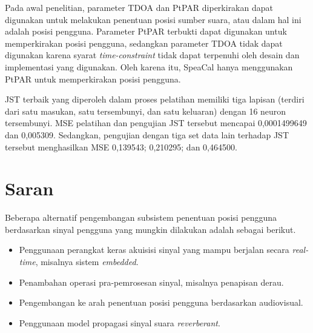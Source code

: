 Pada awal penelitian, parameter TDOA dan PtPAR diperkirakan dapat digunakan untuk melakukan penentuan posisi sumber suara, atau dalam hal ini adalah posisi pengguna. Parameter PtPAR terbukti dapat digunakan untuk memperkirakan posisi pengguna, sedangkan parameter TDOA tidak dapat digunakan karena syarat \textit{time-constraint} tidak dapat terpenuhi oleh desain dan implementasi yang digunakan. Oleh karena itu, SpeaCal hanya menggunakan PtPAR untuk memperkirakan posisi pengguna.

JST terbaik yang diperoleh dalam proses pelatihan memiliki tiga lapisan (terdiri dari satu masukan, satu tersembunyi, dan satu keluaran) dengan 16 neuron tersembunyi. MSE pelatihan dan pengujian JST tersebut mencapai 0,0001499649 dan 0,005309. Sedangkan, pengujian dengan tiga set data lain terhadap JST tersebut menghasilkan MSE 0,139543; 0,210295; dan 0,464500.



\section{Saran}

Beberapa alternatif pengembangan subsistem penentuan posisi pengguna berdasarkan sinyal pengguna yang mungkin dilakukan adalah sebagai berikut.

\begin{itemize}
\item Penggunaan perangkat keras akuisisi sinyal yang mampu berjalan secara \textit{real-time}, misalnya sistem \textit{embedded}.
\item Penambahan operasi pra-pemrosesan sinyal, misalnya penapisan derau.
\item Pengembangan ke arah penentuan posisi pengguna berdasarkan audiovisual.
\item Penggunaan model propagasi sinyal suara \textit{reverberant}.
\end{itemize}
